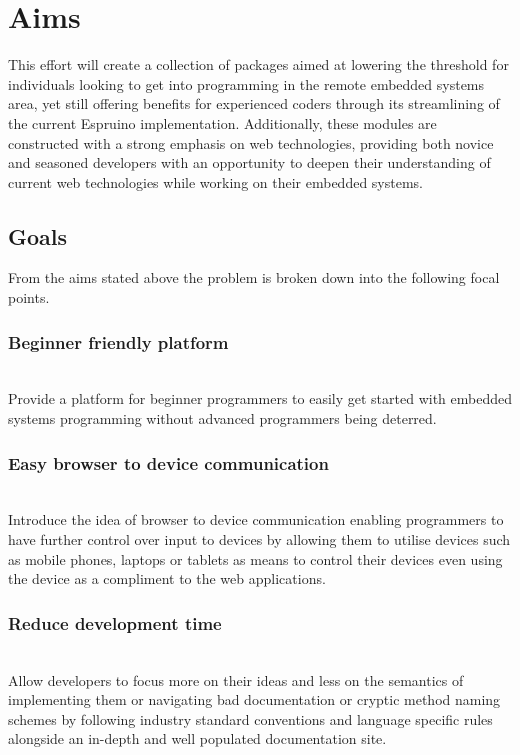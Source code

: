 \documentclass{l4proj}
\begin{document}
\section{Aims}

\text This effort will create a collection of packages aimed at lowering the threshold for individuals looking to get into programming in the remote embedded systems area, yet still offering benefits for experienced coders through its streamlining of the current Espruino implementation. Additionally, these modules are constructed with a strong emphasis on web technologies, providing both novice and seasoned developers with an opportunity to deepen their understanding of current web technologies while working on their embedded systems.
\subsection{Goals}
\text From the aims stated above the problem is broken down into the following focal points.
\\
\subsubsection{Beginner friendly platform} \hfill\\
\text Provide a platform for beginner programmers to easily get started with embedded systems programming without advanced programmers being deterred.
\\
\subsubsection{Easy browser to device communication} \hfill\\
\text Introduce the idea of browser to device communication enabling programmers to have further control over input to devices by allowing them to utilise devices such as mobile phones, laptops or tablets as means to control their devices even using the device as a compliment to the web applications.
\\
\subsubsection{Reduce development time} \hfill\\
\text Allow developers to focus more on their ideas and less on the semantics of implementing them or navigating bad documentation or cryptic method naming schemes by following industry standard conventions and language specific rules alongside an in-depth and well populated documentation site.
\\
\end{document}
